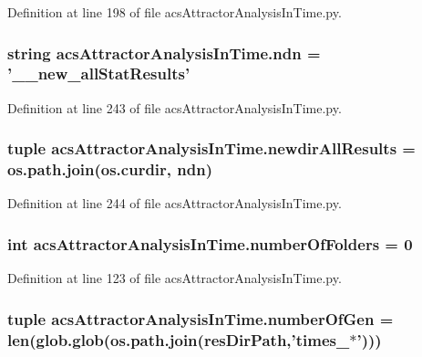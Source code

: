 Definition at line 198 of file acs\-Attractor\-Analysis\-In\-Time.\-py.

\hypertarget{a00123_ab0e0a55161ee1fd9fb0f086a328f67b7}{
\subsubsection[{ndn}]{\setlength{\rightskip}{0pt plus 5cm}string acs\-Attractor\-Analysis\-In\-Time.\-ndn = '\-\_\-\_\-new\-\_\-all\-Stat\-Results'}}\label{a00123_ab0e0a55161ee1fd9fb0f086a328f67b7}


Definition at line 243 of file acs\-Attractor\-Analysis\-In\-Time.\-py.

\hypertarget{a00123_aaf0f6fcbaaf97dcff16b62e86df0209c}{
\subsubsection[{newdir\-All\-Results}]{\setlength{\rightskip}{0pt plus 5cm}tuple acs\-Attractor\-Analysis\-In\-Time.\-newdir\-All\-Results = os.\-path.\-join(os.\-curdir, {\bf ndn})}}\label{a00123_aaf0f6fcbaaf97dcff16b62e86df0209c}


Definition at line 244 of file acs\-Attractor\-Analysis\-In\-Time.\-py.

\hypertarget{a00123_a3a2fe097086bb0f4a505fca8f53dc2b0}{
\subsubsection[{number\-Of\-Folders}]{\setlength{\rightskip}{0pt plus 5cm}int acs\-Attractor\-Analysis\-In\-Time.\-number\-Of\-Folders = 0}}\label{a00123_a3a2fe097086bb0f4a505fca8f53dc2b0}


Definition at line 123 of file acs\-Attractor\-Analysis\-In\-Time.\-py.

\hypertarget{a00123_a28cc280ff54c726bd790cf781d3bab8c}{
\subsubsection[{number\-Of\-Gen}]{\setlength{\rightskip}{0pt plus 5cm}tuple acs\-Attractor\-Analysis\-In\-Time.\-number\-Of\-Gen = len(glob.\-glob(os.\-path.\-join({\bf res\-Dir\-Path},'times\-\_\-$\ast$')))}}\label{a00123_a28cc280ff54c726bd790cf781d3bab8c}


